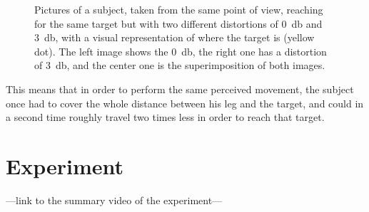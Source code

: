 \begin{figure}[h]
    \caption{Pictures of a subject, taken from the same point of view, reaching for the same target but with two different distortions of \SI{0}{\decibel} and \SI{3}{\decibel}, with a visual representation of where the target is (yellow dot). The left image shows the \SI{0}{\decibel}, the right one has a distortion of \SI{3}{\decibel}, and the center one is the superimposition of both images.}
    \label{fig:realMocapDistortion}
\end{figure}

This means that in order to perform the same perceived movement, the subject once had to cover the whole distance between his leg and the target, and could in a second time roughly travel two times less in order to reach that target.

\section{Experiment}

---link to the summary video of the experiment---
